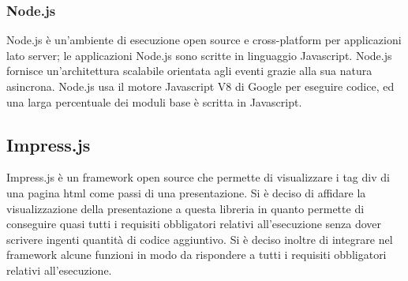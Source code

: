 	\subsubsection{Node.js}{
		Node.js è un'ambiente di esecuzione open source e cross-platform per applicazioni lato server; le applicazioni Node.js sono scritte in linguaggio Javascript. Node.js fornisce un'architettura scalabile orientata agli eventi grazie alla sua natura asincrona.
		Node.js usa il motore Javascript V8 di Google per eseguire codice, ed una larga percentuale dei moduli base è scritta in Javascript.
	}
	\subsection{Impress.js}{
		Impress.js è un framework open source che permette di visualizzare i tag div di una pagina html come passi di una presentazione. Si è deciso di affidare la visualizzazione della presentazione a questa libreria in quanto permette di conseguire quasi tutti i requisiti obbligatori relativi all’esecuzione senza dover scrivere ingenti quantità di codice aggiuntivo.
		Si è deciso inoltre di integrare nel framework alcune funzioni in modo da rispondere a tutti i requisiti obbligatori relativi all’esecuzione.
	}